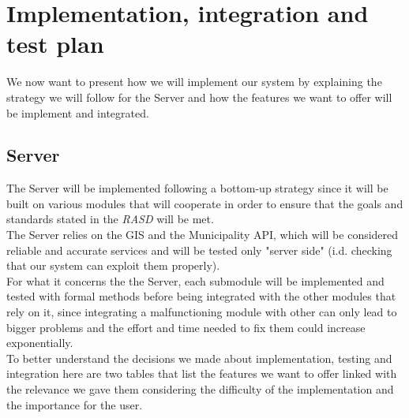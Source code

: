 \section{Implementation, integration and test plan}

    We now want to present how we will implement our system by explaining the strategy we will follow for the Server
    and how the features we want to offer will be implement and integrated.\\
        
        \subsection{Server}
        The Server will be implemented following a bottom-up strategy since it will be built on various modules that will cooperate in order
        to ensure that the goals and standards stated in the \emph{RASD}\cite{RASD} will be met.\\
        The Server relies on the GIS and the Municipality API, which will be considered reliable and accurate services and will be
        tested only "server side" (i.d. checking that our system can exploit them properly).\\
        For what it concerns the the Server, each submodule will be implemented and tested with formal methods before being integrated 
        with the other modules that rely on it, since integrating a malfunctioning module with other can only lead to bigger problems 
        and the effort and time needed to fix them could increase exponentially.\\
        To better understand the decisions we made about implementation, testing and integration here are two tables that list the features
        we want to offer linked with the relevance we gave them considering the difficulty of the implementation and the importance for 
        the user.\\
        
